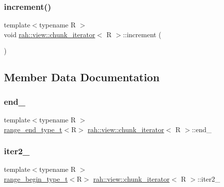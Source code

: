\subsubsection{\texorpdfstring{increment()}{increment()}}
{\footnotesize\ttfamily template$<$typename R $>$ \\
void \mbox{\hyperlink{structrah_1_1view_1_1chunk__iterator}{rah\+::view\+::chunk\+\_\+iterator}}$<$ R $>$\+::increment (\begin{DoxyParamCaption}{ }\end{DoxyParamCaption})\hspace{0.3cm}{\ttfamily [inline]}}



\subsection{Member Data Documentation}
\mbox{\label{structrah_1_1view_1_1chunk__iterator_a37b0e8a9c07d2061a63ea52c8166f1e2}} 
\subsubsection{\texorpdfstring{end\_}{end\_}}
{\footnotesize\ttfamily template$<$typename R $>$ \\
\mbox{\hyperlink{namespacerah_a3042a09fc211e86eea6771d01375d263}{range\+\_\+end\+\_\+type\+\_\+t}}$<$R$>$ \mbox{\hyperlink{structrah_1_1view_1_1chunk__iterator}{rah\+::view\+::chunk\+\_\+iterator}}$<$ R $>$\+::end\+\_\+}

\mbox{\label{structrah_1_1view_1_1chunk__iterator_a99000f50d2444885032d0346fc0edd52}} 
\subsubsection{\texorpdfstring{iter2\_}{iter2\_}}
{\footnotesize\ttfamily template$<$typename R $>$ \\
\mbox{\hyperlink{namespacerah_afa7f59d1f37c7b9d9caed37551be9eaa}{range\+\_\+begin\+\_\+type\+\_\+t}}$<$R$>$ \mbox{\hyperlink{structrah_1_1view_1_1chunk__iterator}{rah\+::view\+::chunk\+\_\+iterator}}$<$ R $>$\+::iter2\+\_\+}

